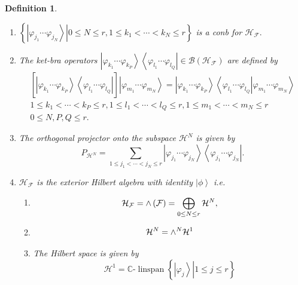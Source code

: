 \documentclass[aps,preprint]{revtex4}%
\newtheorem{definition}[theorem]{Definition}
\begin{document}
\begin{definition}
\begin{enumerate}
\item $\left\{  \left.  \left\vert \varphi_{j_{1}}\cdots\varphi_{j_{N}%
}\right\rangle \right\vert 0\leq N\leq r,1\leq k_{1}<\cdots<k_{N}\leq
r\right\}  $ is a conb for $\mathcal{H}_{\mathcal{F}}.$

\item The ket-bra operators $\left\vert \varphi_{k_{1}}\cdots\varphi_{k_{P}%
}\right\rangle \left\langle \varphi_{l_{1}}\cdots\varphi_{l_{Q}}\right\vert
\in\mathcal{B}\left(  \mathcal{H}_{\mathcal{F}}\right)  $ are defined by
\begin{gather}
\left[  \overset{}{\left\vert \varphi_{k_{1}}\cdots\varphi_{k_{P}%
}\right\rangle \left\langle \varphi_{l_{1}}\cdots\varphi_{l_{Q}}\right\vert
}\right]  \left\vert \varphi_{m_{1}}\cdots\varphi_{m_{N}}\right\rangle
=\left\vert \varphi_{k_{1}}\cdots\varphi_{k_{P}}\right\rangle \left\langle
\left.  \varphi_{l_{1}}\cdots\varphi_{l_{Q}}\right\vert \varphi_{m_{1}}%
\cdots\varphi_{m_{N}}\right\rangle \\
1\leq k_{1}<\cdots<k_{P}\leq r,1\leq l_{1}<\cdots<l_{Q}\leq r,1\leq
m_{1}<\cdots<m_{N}\leq r\\
0\leq N,P,Q\leq r.
\end{gather}


\item The orthogonal projector onto the subspace $\mathcal{H}^{N}$ is given
by
\begin{equation}
P_{\mathcal{H}^{N}}=\sum_{1\leq j_{1}<\cdots<j_{N}\leq r}\left\vert
\varphi_{j_{1}}\cdots\varphi_{j_{N}}\right\rangle \left\langle \varphi_{j_{1}%
}\cdots\varphi_{j_{N}}\right\vert .
\end{equation}


\item $\mathcal{H}_{\mathcal{F}}$ is the exterior Hilbert algebra with
identity $\left\vert \phi\right\rangle $ i.e.

\begin{enumerate}
\item
\begin{equation}
\mathcal{H}_{\mathcal{F}}={\LARGE \wedge}\left(  \mathcal{F}\right)
=\bigoplus\limits_{0\leq N\leq r}\mathcal{H}^{N},
\end{equation}


\item
\begin{equation}
\mathcal{H}^{N}={\LARGE \wedge}^{N}\mathcal{H}^{1}%
\end{equation}


\item The Hilbert space is given by
\begin{equation}
\mathcal{H}^{1}=\mathbb{C}\text{-}\operatorname{linspan}\left\{  \left.
\left\vert \varphi_{j}\right\rangle \right\vert 1\leq j\leq r\right\}
\end{equation}



\end{enumerate}
\end{enumerate}
\end{definition}
\end{document}
